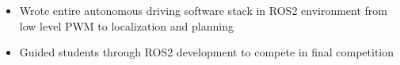 \documentclass[10pt,a4paper,ragged2e,withhyper]{altacv}
\begin{document}
\begin{paracol}{2}
  \begin{itemize}
    \item Wrote entire autonomous driving software stack in ROS2 environment from low level PWM to localization and planning
    \item Guided students through ROS2 development to compete in final competition
  \end{itemize}

  \nocite{*}

  \printbibliography[heading=pubtype,title={\printinfo{\faUsers}{Conference Proceedings}},type=inproceedings]
\end{paracol}
\end{document}
